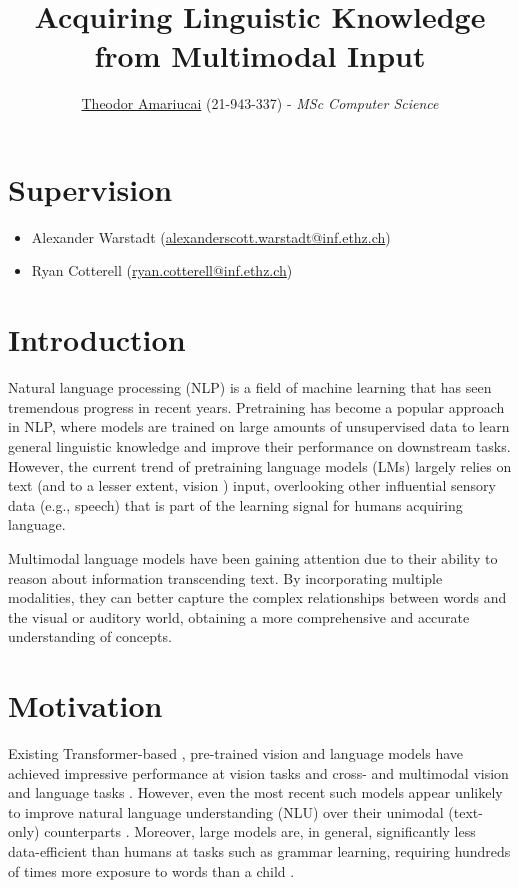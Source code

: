 \documentclass{article}
\title{Acquiring Linguistic Knowledge from Multimodal Input\\}
\author{\href{mailto:tamariucai@student.ethz.ch}{Theodor Amariucai} (21-943-337) - \emph{MSc Computer Science}}
\date{\vspace{-5ex}} %
\begin{document}
\maketitle
\thispagestyle{firstpage}

\section*{Supervision}

\begin{itemize}
\renewcommand\labelitemi{--}
    \item Alexander Warstadt (\href{mailto:alexanderscott.warstadt@inf.ethz.ch}{alexanderscott.warstadt@inf.ethz.ch})
    \item Ryan Cotterell (\href{mailto:ryan.cotterell@inf.ethz.ch}{ryan.cotterell@inf.ethz.ch})
\end{itemize}

\section*{Introduction}

Natural language processing (NLP) is a field of machine learning that has seen tremendous progress in recent years. Pretraining has become a popular approach in NLP, where models are trained on large amounts of unsupervised data to learn general linguistic knowledge and improve their performance on downstream tasks. However, the current trend of pretraining language models (LMs) largely relies on text \cite{BERT, DeBERTa, RoBERTa} (and to a lesser extent, vision \cite{FLAVA, Bugliarello2020, ViLBERT}) input, overlooking other influential sensory data (e.g., speech) that is part of the learning signal for humans acquiring language.

Multimodal language models have been gaining attention due to their ability to reason about information transcending text. By incorporating multiple modalities, they can better capture the complex relationships between words and the visual or auditory world, obtaining a more comprehensive and accurate understanding of concepts.

\section*{Motivation}

Existing Transformer-based \cite{Vaswani2017}, pre-trained vision and language models have achieved impressive performance at vision tasks and cross- and multimodal vision and language tasks \cite{FLAVA}. However, even the most recent such models appear unlikely to improve natural language understanding (NLU) over their unimodal (text-only) counterparts \cite{BrownStudy, AlexThesis}. Moreover, large models are, in general, significantly less data-efficient than humans at tasks such as grammar learning, requiring hundreds of times more exposure to words than a child \cite{AlexThesis}.
\end{document}
